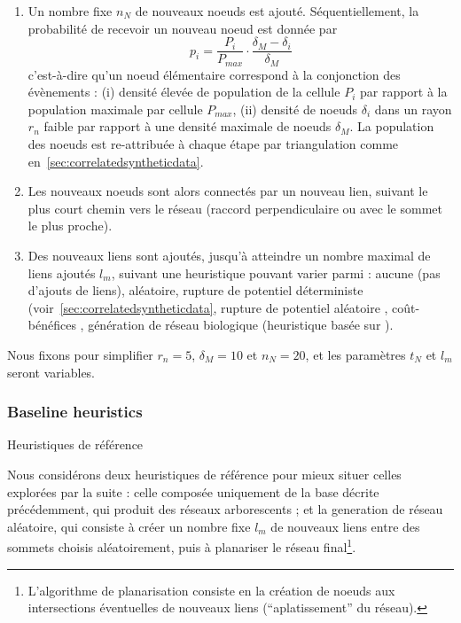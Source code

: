 \begin{enumerate}
	\item Un nombre fixe $n_N$ de nouveaux noeuds est ajouté. Séquentiellement, la probabilité de recevoir un nouveau noeud est donnée par
\[
p_i = \frac{P_i}{P_{max}} \cdot \frac{\delta_M - \delta_i}{\delta_M}
\]
c'est-à-dire qu'un noeud élémentaire correspond à la conjonction des évènements : (i) densité élevée de population de la cellule $P_i$ par rapport à la population maximale par cellule $P_{max}$, (ii) densité de noeuds $\delta_i$ dans un rayon $r_n$ faible par rapport à une densité maximale de noeuds $\delta_M$. La population des noeuds est re-attribuée à chaque étape par triangulation comme en~\ref{sec:correlatedsyntheticdata}.
	\item Les nouveaux noeuds sont alors connectés par un nouveau lien, suivant le plus court chemin vers le réseau (raccord perpendiculaire ou avec le sommet le plus proche).
	\item Des nouveaux liens sont ajoutés, jusqu'à atteindre un nombre maximal de liens ajoutés $l_{m}$, suivant une heuristique pouvant varier parmi :  aucune (pas d'ajouts de liens), aléatoire, rupture de potentiel déterministe (voir~\ref{sec:correlatedsyntheticdata}, rupture de potentiel aléatoire \cite{schmitt2014modelisation}, coût-bénéfices \cite{louf2013emergence}, génération de réseau biologique (heuristique basée sur \cite{tero2010rules}).
\end{enumerate}


Nous fixons pour simplifier $r_n = 5$, $\delta_M = 10$ et $n_N=20$, et les paramètres $t_N$ et $l_m$ seront variables.


\subsubsection{Baseline heuristics}{Heuristiques de référence}

Nous considérons deux heuristiques de référence pour mieux situer celles explorées par la suite : celle composée uniquement de la base décrite précédemment, qui produit des réseaux arborescents ; et la generation de réseau aléatoire, qui consiste à créer un nombre fixe $l_m$ de nouveaux liens entre des sommets choisis aléatoirement, puis à planariser le réseau final\footnote{L'algorithme de planarisation consiste en la création de noeuds aux intersections éventuelles de nouveaux liens (``aplatissement'' du réseau).}.


